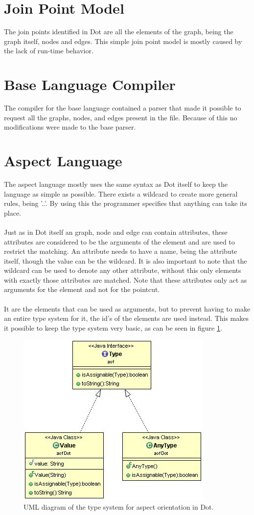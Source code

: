 \documentclass[a4paper]{report}
\begin{document}
\section{Join Point Model}
The join points identified in Dot are all the elements of the graph, being the graph itself, nodes and edges. This simple join point model is mostly caused by the lack of run-time behavior.

\section{Base Language Compiler}
The compiler for the base language contained a parser that made it possible to request all the graphs, nodes, and edges present in the file. Because of this no modifications were made to the base parser.

\section{Aspect Language}
The aspect language mostly uses the same syntax as Dot itself to keep the language as simple as possible. There exists a wildcard to create more general rules, being '..'. By using this the programmer specifies that anything can take its place.\\
\\
Just as in Dot itself an graph, node and edge can contain attributes, these attributes are considered to be the arguments of the element and are used to restrict the matching. An attribute needs to have a name, being the attribute itself, though the value can be the wildcard. It is also important to note that the wildcard can be used to denote any other attribute, without this only elements with exactly those attributes are matched. Note that these attributes only act as arguments for the element and not for the pointcut.\\
\\
It are the elements that can be used as arguments, but to prevent having to make an entire type system for it, the id's of the elements are used instead. This makes it possible to keep the type system very basic, as can be seen in figure \ref{fig:DotType}.
\begin{figure}[h]
\centering
\includegraphics[scale=0.7]{images/AOFDot/DotType.jpg}
\caption{UML diagram of the type system for aspect orientation in Dot.}
\label{fig:DotType}
\end{figure}\\
\end{document}
